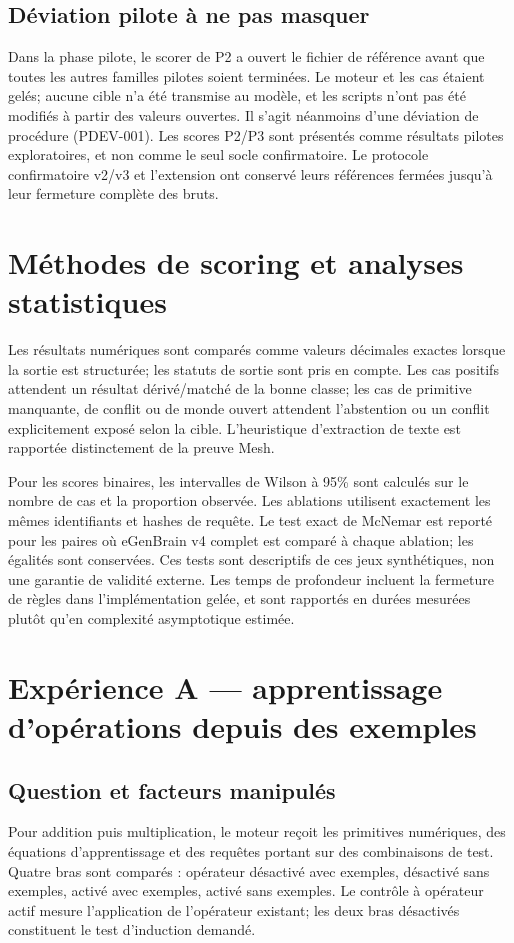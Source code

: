\documentclass[11pt,a4paper]{article}
\begin{document}
\subsection{Déviation pilote à ne pas masquer}
Dans la phase pilote, le scorer de P2 a ouvert le fichier de référence avant que toutes les autres familles pilotes soient terminées. Le moteur et les cas étaient gelés; aucune cible n’a été transmise au modèle, et les scripts n’ont pas été modifiés à partir des valeurs ouvertes. Il s’agit néanmoins d’une déviation de procédure (PDEV-001). Les scores P2/P3 sont présentés comme résultats pilotes exploratoires, et non comme le seul socle confirmatoire. Le protocole confirmatoire v2/v3 et l’extension ont conservé leurs références fermées jusqu’à leur fermeture complète des bruts.

\section{Méthodes de scoring et analyses statistiques}
Les résultats numériques sont comparés comme valeurs décimales exactes lorsque la sortie est structurée; les statuts de sortie sont pris en compte. Les cas positifs attendent un résultat dérivé/matché de la bonne classe; les cas de primitive manquante, de conflit ou de monde ouvert attendent l’abstention ou un conflit explicitement exposé selon la cible. L’heuristique d’extraction de texte est rapportée distinctement de la preuve Mesh.

Pour les scores binaires, les intervalles de Wilson à 95\% sont calculés sur le nombre de cas et la proportion observée. Les ablations utilisent exactement les mêmes identifiants et hashes de requête. Le test exact de McNemar est reporté pour les paires où eGenBrain v4 complet est comparé à chaque ablation; les égalités sont conservées. Ces tests sont descriptifs de ces jeux synthétiques, non une garantie de validité externe. Les temps de profondeur incluent la fermeture de règles dans l’implémentation gelée, et sont rapportés en durées mesurées plutôt qu’en complexité asymptotique estimée.

\section{Expérience A — apprentissage d’opérations depuis des exemples}
\subsection{Question et facteurs manipulés}
Pour addition puis multiplication, le moteur reçoit les primitives numériques, des équations d’apprentissage et des requêtes portant sur des combinaisons de test. Quatre bras sont comparés : opérateur désactivé avec exemples, désactivé sans exemples, activé avec exemples, activé sans exemples. Le contrôle à opérateur actif mesure l’application de l’opérateur existant; les deux bras désactivés constituent le test d’induction demandé.
\end{document}
